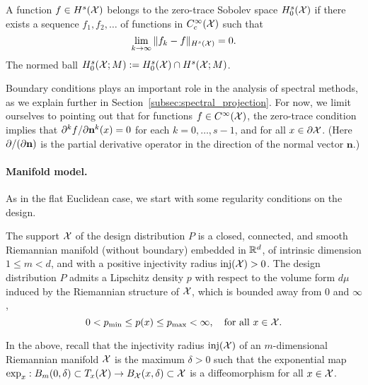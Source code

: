 \begin{definition}
	\label{def:zero_trace_sobolev_space}
	A function $f \in H^s(\mathcal{X})$ belongs to the zero-trace Sobolev space $H_0^s(\mathcal{X})$ if there exists a sequence $f_1,f_2,\ldots$ of functions in $C_c^{\infty}(\mathcal{X})$ such that
	\begin{equation*}
	\lim_{k \to \infty}\|f_k - f\|_{H^s(\mathcal{X})} = 0.
	\end{equation*}
	The normed ball $H_0^{s}(\mathcal{X};M) := H_0^{s}(\mathcal{X}) \cap H^{s}(\mathcal{X};M)$.
\end{definition}
Boundary conditions plays an important role in the analysis of spectral methods, as we explain further in Section~\ref{subsec:spectral_projection}. For now, we limit ourselves to pointing out that for functions $f \in C^\infty(\mathcal{X})$, the zero-trace condition implies that $\partial^{k}f/\partial{\bf n}^k(x) = 0$ for each $k = 0,\ldots,s - 1$, and for all $x \in \partial\mathcal{X}$. (Here $\partial/(\partial {\bf n})$ is the partial derivative operator in the direction of the normal vector $\mathbf{n}$.)
\paragraph{Manifold model.}
As in the flat Euclidean case, we start with some regularity conditions on the design.
\begin{definition}
	\label{def:model_manifold}
	The support $\mathcal{X}$ of the design distribution $P$ is a closed, connected, and smooth Riemannian manifold (without boundary) embedded in $\mathbb{R}^d$, of intrinsic dimension $1 \leq m < d$, and with a positive injectivity radius $\mathrm{inj}(\mathcal{X}) > 0$. The design distribution $P$ admits a Lipschitz density $p$ with respect to the volume form $d\mu$ induced by the Riemannian structure of $\mathcal{X}$, which is bounded away from $0$ and $\infty$,
	\begin{equation*}
	0 < p_{\min} \leq p(x) \leq p_{\max} < \infty, \quad \textrm{for all $x \in \mathcal{X}$.}
	\end{equation*}
\end{definition}
In the above, recall that the injectivity radius $\mathrm{inj}(\mathcal{X})$ of an $m$-dimensional Riemannian manifold $\mathcal{X}$ is the maximum $\delta > 0$ such that the exponential map $\exp_x: B_m(0,\delta) \subset T_x(\mathcal{X}) \to B_{\mathcal{X}}(x,\delta) \subset \mathcal{X}$ is a diffeomorphism for all $x \in \mathcal{X}$.

